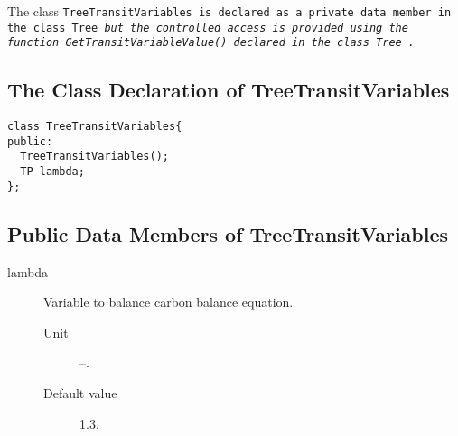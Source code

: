 The class \tt TreeTransitVariables \rm is declared as a private data
member in the class \tt Tree \it but the controlled access is provided
using the function \tt GetTransitVariableValue() \rm declared in the
class \tt Tree \rm.  

\subsection{The Class Declaration of TreeTransitVariables}
\begin{verbatim}
class TreeTransitVariables{
public:
  TreeTransitVariables();
  TP lambda;        
};
\end{verbatim}

\subsection{Public Data Members of TreeTransitVariables}
  \begin{description}
    \item[lambda] Variable to balance carbon balance equation.
      \begin{description}
        \item[Unit] --.
        \item[Default value] 1.3.
      \end{description}
 \end{description}









